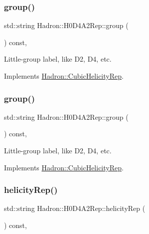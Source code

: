 \subsubsection{\texorpdfstring{group()}{group()}\hspace{0.1cm}{\footnotesize\ttfamily [2/3]}}
{\footnotesize\ttfamily std\+::string Hadron\+::\+H0\+D4\+A2\+Rep\+::group (\begin{DoxyParamCaption}{ }\end{DoxyParamCaption}) const\hspace{0.3cm}{\ttfamily [inline]}, {\ttfamily [virtual]}}

Little-\/group label, like D2, D4, etc. 

Implements \mbox{\hyperlink{structHadron_1_1CubicHelicityRep_a101a7d76cd8ccdad0f272db44b766113}{Hadron\+::\+Cubic\+Helicity\+Rep}}.

\mbox{\label{structHadron_1_1H0D4A2Rep_a9bffbf0884c199fda3b8b85c4f43e333}} 
\subsubsection{\texorpdfstring{group()}{group()}\hspace{0.1cm}{\footnotesize\ttfamily [3/3]}}
{\footnotesize\ttfamily std\+::string Hadron\+::\+H0\+D4\+A2\+Rep\+::group (\begin{DoxyParamCaption}{ }\end{DoxyParamCaption}) const\hspace{0.3cm}{\ttfamily [inline]}, {\ttfamily [virtual]}}

Little-\/group label, like D2, D4, etc. 

Implements \mbox{\hyperlink{structHadron_1_1CubicHelicityRep_a101a7d76cd8ccdad0f272db44b766113}{Hadron\+::\+Cubic\+Helicity\+Rep}}.

\mbox{\label{structHadron_1_1H0D4A2Rep_a4998188757fbc152763b632ab09afbcf}} 
\subsubsection{\texorpdfstring{helicityRep()}{helicityRep()}\hspace{0.1cm}{\footnotesize\ttfamily [1/2]}}
{\footnotesize\ttfamily std\+::string Hadron\+::\+H0\+D4\+A2\+Rep\+::helicity\+Rep (\begin{DoxyParamCaption}{ }\end{DoxyParamCaption}) const\hspace{0.3cm}{\ttfamily [inline]}, {\ttfamily [virtual]}}

